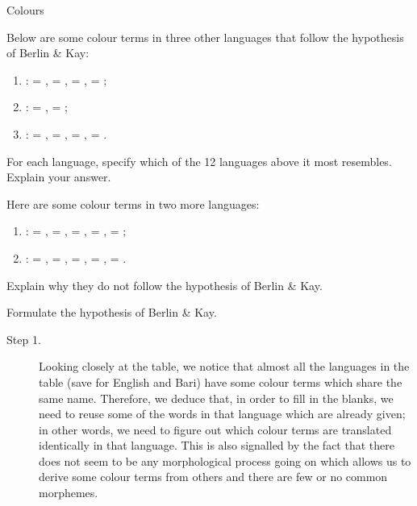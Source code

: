 \begin{refsection}
\begin{problem}{Colours}{\nameVNeacsu}{}
\begin{assgts}
\item \fillblanks
\item Below are some colour terms in three other languages that follow the hypothesis of Berlin \& Kay:
\begin{enumerate}[label = \alph*.]
    \item \langnameUrhobo:  = ,  = ,  = ,  = ;
    \item \langnameNgombe:  = ,  = ;
    \item \langnameTanna:  = ,  = ,  = ,  = .
\end{enumerate}
\item[] For each language, specify which of the 12 languages above it most resembles. Explain your answer.
\item Here are some colour terms in two more languages: 
\begin{enumerate}[label = \alph*., start = 4]\sloppy
    \item \langnameAcehnese:  = ,  = ,  = ,  = ,  = ;
    \item \langnameAlabama:  = ,  = ,  = ,  = ,  = .
\end{enumerate}
\item[] Explain why they do not follow the hypothesis of Berlin \& Kay.
\item Formulate the hypothesis of Berlin \& Kay.
\end{assgts}
\end{problem}
\begin{mysolution}
\begin{description}
  \item [{Step 1.}] Looking closely at the table, we notice that almost all the languages in the table (save for English and Bari) have some colour terms which share the same name. Therefore, we deduce that, in order to fill in the blanks, we need to reuse some of the words in that language which are already given; in other words, we need to figure out which colour terms are translated identically in that language. This is also signalled by the fact that there does not seem to be any morphological process going on which allows us to derive some colour terms from others and there are few or no common morphemes.
  

\end{description}
\end{mysolution}
\end{refsection}
